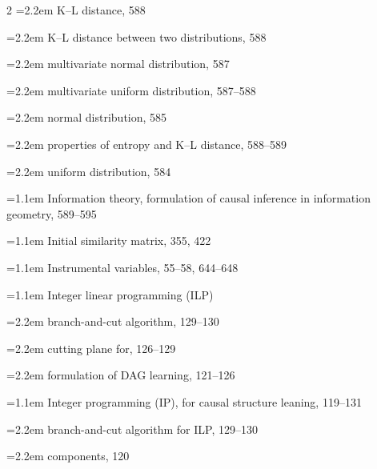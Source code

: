 \begin{multicols}{2}
\noindent\hangindent=2.2em \hspace*{1.1em}K--L distance, 588\par
\noindent\hangindent=2.2em \hspace*{1.1em}K--L distance between two distributions, 588\par
\noindent\hangindent=2.2em \hspace*{1.1em}multivariate normal distribution, 587\par
\noindent\hangindent=2.2em \hspace*{1.1em}multivariate uniform distribution, 587--588\par
\noindent\hangindent=2.2em \hspace*{1.1em}normal distribution, 585\par
\noindent\hangindent=2.2em \hspace*{1.1em}properties of entropy and K--L distance, 588--589\par
\noindent\hangindent=2.2em \hspace*{1.1em}uniform distribution, 584\par
\noindent\hangindent=1.1em Information theory, formulation of causal inference in information geometry, 589--595\par
\noindent\hangindent=1.1em Initial similarity matrix, 355, 422\par
\noindent\hangindent=1.1em Instrumental variables, 55--58, 644--648\par
\noindent\hangindent=1.1em Integer linear programming (ILP)\par
\noindent\hangindent=2.2em \hspace*{1.1em}branch-and-cut algorithm, 129--130\par
\noindent\hangindent=2.2em \hspace*{1.1em}cutting plane for, 126--129\par
\noindent\hangindent=2.2em \hspace*{1.1em}formulation of DAG learning, 121--126\par
\noindent\hangindent=1.1em Integer programming (IP), for causal structure leaning, 119--131\par
\noindent\hangindent=2.2em \hspace*{1.1em}branch-and-cut algorithm for ILP, 129--130\par
\noindent\hangindent=2.2em \hspace*{1.1em}components, 120\par

\end{multicols}
